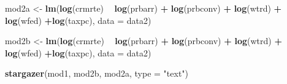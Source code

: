 \documentclass[]{article}
\newenvironment{Shaded}{\begin{snugshade}}{\end{snugshade}}
\newcommand{\DataTypeTok}[1]{\textcolor[rgb]{0.13,0.29,0.53}{#1}}
\newcommand{\KeywordTok}[1]{\textcolor[rgb]{0.13,0.29,0.53}{\textbf{#1}}}
\newcommand{\NormalTok}[1]{#1}
\newcommand{\OperatorTok}[1]{\textcolor[rgb]{0.81,0.36,0.00}{\textbf{#1}}}
\newcommand{\StringTok}[1]{\textcolor[rgb]{0.31,0.60,0.02}{#1}}
\begin{document}
\begin{Shaded}
\begin{Highlighting}[]
\NormalTok{mod2a <-}\StringTok{ }\KeywordTok{lm}\NormalTok{(}\KeywordTok{log}\NormalTok{(crmrte) }\OperatorTok{~}\StringTok{ }\KeywordTok{log}\NormalTok{(prbarr) }\OperatorTok{+}\StringTok{ }\KeywordTok{log}\NormalTok{(prbconv) }\OperatorTok{+}\StringTok{ }\KeywordTok{log}\NormalTok{(wtrd) }\OperatorTok{+}\StringTok{ }\KeywordTok{log}\NormalTok{(wfed) }\OperatorTok{+}\KeywordTok{log}\NormalTok{(taxpc), }\DataTypeTok{data =}\NormalTok{ data2)}

\NormalTok{mod2b <-}\StringTok{ }\KeywordTok{lm}\NormalTok{(}\KeywordTok{log}\NormalTok{(crmrte) }\OperatorTok{~}\StringTok{ }\KeywordTok{log}\NormalTok{(prbarr) }\OperatorTok{+}\StringTok{ }\KeywordTok{log}\NormalTok{(prbconv) }\OperatorTok{+}\StringTok{ }\KeywordTok{log}\NormalTok{(wtrd) }\OperatorTok{+}\StringTok{ }\KeywordTok{log}\NormalTok{(wfed) }\OperatorTok{+}\KeywordTok{log}\NormalTok{(taxpc), }\DataTypeTok{data =}\NormalTok{ data2)}

\KeywordTok{stargazer}\NormalTok{(mod1, mod2b, mod2a, }\DataTypeTok{type =} \StringTok{"text"}\NormalTok{)}
\end{Highlighting}
\end{Shaded}
\end{document}
